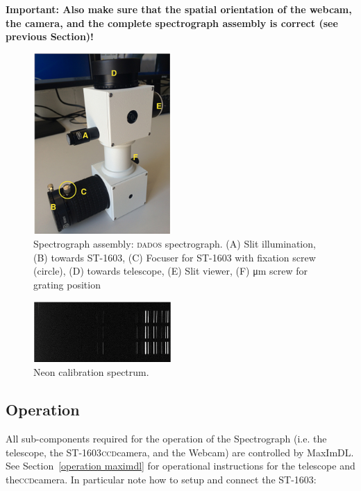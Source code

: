 \documentclass[a4paper, 11pt, fleqn]{memoir}
\begin{document}
\textbf{Important: Also make sure that the spatial orientation of the webcam, the camera, and the complete spectrograph assembly is correct (see previous Section)!}

\begin{figure}[t!]
    \centering
    \includegraphics[width=0.47\textwidth]{dados-assembly-1}
    \caption{Spectrograph assembly: \textsc{dados} spectrograph. \newline (A) Slit illumination, (B) towards ST-1603, (C) Focuser for ST-1603 with fixation screw (circle), (D) towards telescope, (E) Slit viewer,  (F) \si{\um} screw for grating position }
    \label{dados main}
\end{figure}

\begin{figure}[t!]
    \centering
    \includegraphics[width=0.47\textwidth]{neon}
    \caption{Neon calibration spectrum.}
    \label{neon spectrum}
\end{figure}

\subsection{Operation}

All sub-components required for the operation of the Spectrograph (i.e. the telescope, the ST-1603\textsc{ccd}camera, and the Webcam) are controlled by MaxImDL.
See Section~\ref{operation maximdl} for operational instructions for the telescope and the\textsc{ccd}camera.
In particular note how to setup and connect the ST-1603:\\
\end{document}
